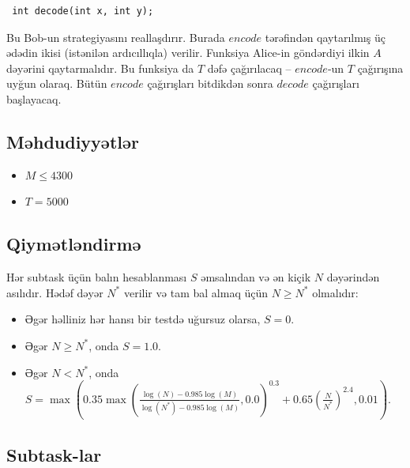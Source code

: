 \documentclass[12pt]{article}
\begin{document}
\begin{lstlisting}
 int decode(int x, int y);
\end{lstlisting}

Bu Bob-un strategiyasını reallaşdırır. Burada $encode$ tərəfindən qaytarılmış üç ədədin ikisi (istənilən ardıcıllıqla) verilir. Funksiya Alice-in göndərdiyi ilkin $A$ dəyərini qaytarmalıdır. Bu funksiya da $T$ dəfə çağırılacaq – $encode$-un $T$ çağırışına uyğun olaraq. Bütün $encode$ çağırışları bitdikdən sonra $decode$ çağırışları başlayacaq.

\subsection{Məhdudiyyətlər}

\begin{itemize}
\item $M \leq 4300$
\item $T = 5000$
\end{itemize}

\subsection{Qiymətləndirmə}

Hər subtask üçün balın hesablanması $S$ əmsalından və ən kiçik $N$ dəyərindən asılıdır. Hədəf dəyər $N^*$ verilir və tam bal almaq üçün $N \geq N^*$ olmalıdır:

\begin{itemize}
\item Əgər həlliniz hər hansı bir testdə uğursuz olarsa, $S = 0$.
\item Əgər $N \geq N^*$, onda $S = 1.0$.
\item Əgər $N < N^*$, onda 
$S = \max\left(0.35 \max\left(\frac{\log(N) - 0.985 \log(M)}{\log(N^*) - 0.985 \log(M)}, 0.0\right)^{0.3} + 0.65 \left(\frac{N}{N^*}\right)^{2.4}, 0.01\right)$.
\end{itemize}

\subsection{Subtask-lar}
\end{document}
